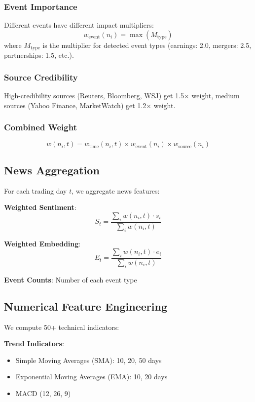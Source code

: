 \documentclass[conference]{IEEEtran}
\begin{document}
\subsubsection{Event Importance}
Different events have different impact multipliers:
$$w_{\text{event}}(n_i) = \max(M_{\text{type}})$$
where $M_{\text{type}}$ is the multiplier for detected event types (earnings: 2.0, mergers: 2.5, partnerships: 1.5, etc.).

\subsubsection{Source Credibility}
High-credibility sources (Reuters, Bloomberg, WSJ) get 1.5× weight, medium sources (Yahoo Finance, MarketWatch) get 1.2× weight.

\subsubsection{Combined Weight}
$$w(n_i, t) = w_{\text{time}}(n_i, t) \times w_{\text{event}}(n_i) \times w_{\text{source}}(n_i)$$

\subsection{News Aggregation}

For each trading day $t$, we aggregate news features:

\textbf{Weighted Sentiment}:
$$S_t = \frac{\sum_{i} w(n_i, t) \cdot s_i}{\sum_{i} w(n_i, t)}$$

\textbf{Weighted Embedding}:
$$E_t = \frac{\sum_{i} w(n_i, t) \cdot e_i}{\sum_{i} w(n_i, t)}$$

\textbf{Event Counts}: Number of each event type

\subsection{Numerical Feature Engineering}

We compute 50+ technical indicators:

\textbf{Trend Indicators}:
\begin{itemize}
    \item Simple Moving Averages (SMA): 10, 20, 50 days
    \item Exponential Moving Averages (EMA): 10, 20 days
    \item MACD (12, 26, 9)
\end{itemize}
\end{document}
